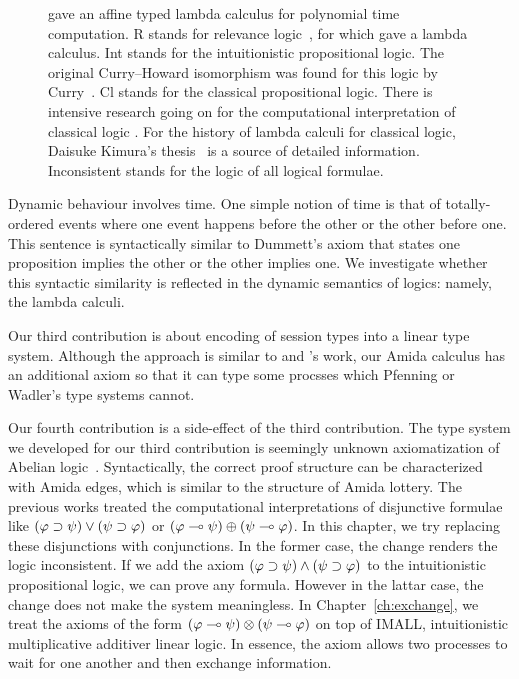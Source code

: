 \begin{figure}
{{  \citet{terui2007} gave an affine typed lambda calculus for polynomial
  time computation.
  \textsf{R} stands for relevance logic~\citep{urquhart1972},
  for which \citet{gabbay1992} gave a lambda calculus.
  \textsf{Int} stands for the intuitionistic propositional logic.
  The original Curry--Howard isomorphism was found for this logic by
  Curry~\citep{curry1942}.
  \textsf{Cl} stands for the classical propositional logic.
  There is intensive research going on for the computational
  interpretation of classical logic \citep{lambdamu,filinski1989,griffin1990,ong-stewart,selinger2001,kakutani2002,curien2000,wadler-dual, wadler-reloaded}.
  For the history of lambda calculi for classical logic,
  Daisuke Kimura's thesis~\cite{kimura} is a source of detailed
  information.
  \textsf{Inconsistent} stands for the logic of all logical formulae.}
  }
  \label{fig:lattice}
 \end{figure}
Dynamic behaviour involves time.
One simple notion of time is that of totally-ordered events where
one event happens before the other or the other before one.
This sentence is syntactically similar to Dummett's axiom that states
one proposition implies the other or the other implies one.
We investigate whether this syntactic similarity is reflected
in the dynamic semantics of logics: namely, the lambda calculi.

Our third contribution is about encoding of session types into a linear
type system.  Although the approach is similar to \citet{pfenning2010} and
\citet{wadler2012propositions}'s work, our Amida calculus has an
additional axiom so that it can type some procsses which Pfenning or
Wadler's type systems cannot.

Our fourth contribution is a side-effect of the third contribution.
The type system we developed for our third contribution is seemingly
unknown axiomatization of Abelian logic~\citep{casari1989}.
Syntactically, the correct proof structure can be characterized with
Amida edges, which is similar to the structure of Amida lottery.
The previous works treated the computational interpretations of
disjunctive formulae like $(\varphi\supset\psi)\lor(\psi\supset\varphi)$ or
$(\varphi\multimap\psi)\oplus(\psi\multimap\varphi)$.  In this chapter, we try
replacing these disjunctions with conjunctions.
In the former case, the change renders the logic inconsistent.
If we add the axiom $(\varphi\supset\psi)\land(\psi\supset\varphi)$ to the
intuitionistic propositional logic,
we can prove any formula.  However in the lattar case, the change does
not make the system meaningless.
In Chapter~\ref{ch:exchange}, we treat
the axioms of the form $(\varphi\multimap\psi)\otimes(\psi\multimap\varphi)$
on top of IMALL, intuitionistic
multiplicative additiver linear
logic.  In essence, the axiom allows two processes to wait for one
another and then exchange information.

